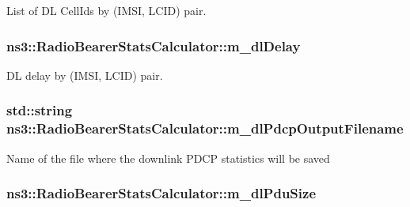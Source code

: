 List of DL Cell\+Ids by (I\+M\+SI, L\+C\+ID) pair. 

\subsubsection[{\texorpdfstring{m\+\_\+dl\+Delay}{m_dlDelay}}]{ ns3\+::\+Radio\+Bearer\+Stats\+Calculator\+::m\+\_\+dl\+Delay\hspace{0.3cm}{\ttfamily [private]}}\hypertarget{classns3_1_1RadioBearerStatsCalculator_a017df18cf72557c4dd14cd3552e58361}{}\label{classns3_1_1RadioBearerStatsCalculator_a017df18cf72557c4dd14cd3552e58361}


DL delay by (I\+M\+SI, L\+C\+ID) pair. 

\subsubsection[{\texorpdfstring{m\+\_\+dl\+Pdcp\+Output\+Filename}{m_dlPdcpOutputFilename}}]{\setlength{\rightskip}{0pt plus 5cm}std\+::string ns3\+::\+Radio\+Bearer\+Stats\+Calculator\+::m\+\_\+dl\+Pdcp\+Output\+Filename\hspace{0.3cm}{\ttfamily [private]}}\hypertarget{classns3_1_1RadioBearerStatsCalculator_a7303f2638298ef3080b41acd5388000b}{}\label{classns3_1_1RadioBearerStatsCalculator_a7303f2638298ef3080b41acd5388000b}
Name of the file where the downlink P\+D\+CP statistics will be saved 
\subsubsection[{\texorpdfstring{m\+\_\+dl\+Pdu\+Size}{m_dlPduSize}}]{ ns3\+::\+Radio\+Bearer\+Stats\+Calculator\+::m\+\_\+dl\+Pdu\+Size\hspace{0.3cm}{\ttfamily [private]}}\hypertarget{classns3_1_1RadioBearerStatsCalculator_aa0a963def36ef9971ce70977f880edd5}{}\label{classns3_1_1RadioBearerStatsCalculator_aa0a963def36ef9971ce70977f880edd5}


